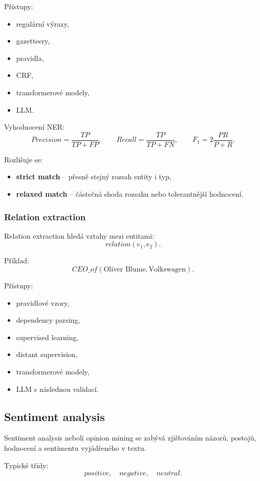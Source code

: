 Přístupy:
\begin{itemize}
    \item regulární výrazy,
    \item gazetteery,
    \item pravidla,
    \item CRF,
    \item transformerové modely,
    \item LLM.
\end{itemize}

Vyhodnocení NER:
\[
Precision=
\frac{TP}{TP+FP},
\qquad
Recall=
\frac{TP}{TP+FN},
\qquad
F_1=
2\frac{PR}{P+R}.
\]

Rozlišuje se:
\begin{itemize}
    \item \textbf{strict match} -- přesně stejný rozsah entity i typ,
    \item \textbf{relaxed match} -- částečná shoda rozsahu nebo tolerantnější hodnocení.
\end{itemize}

\subsubsection{Relation extraction}

Relation extraction hledá vztahy mezi entitami:
\[
relation(e_1,e_2).
\]

Příklad:
\[
CEO\_of(\text{Oliver Blume},\text{Volkswagen}).
\]

Přístupy:
\begin{itemize}
    \item pravidlové vzory,
    \item dependency parsing,
    \item supervised learning,
    \item distant supervision,
    \item transformerové modely,
    \item LLM s následnou validací.
\end{itemize}

\subsection{Sentiment analysis}

Sentiment analysis neboli opinion mining se zabývá zjišťováním názorů, postojů, hodnocení a sentimentu
vyjádřeného v textu.

Typické třídy:
\[
positive,\quad negative,\quad neutral.
\]

